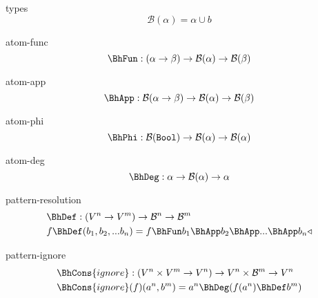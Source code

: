 \documentclass[preview]{standalone}
\begin{document}
\begin{docimage}{types}
  \begin{equation*}%
    \mathcal{B}(\alpha) = \alpha \cup b  
  \end{equation*}
\end{docimage} 


\begin{docimage}{atom-func}
  \begin{equation*}%
    \BhFun : (\alpha \rightarrow \beta) \rightarrow \mathcal{B}(\alpha) \rightarrow \mathcal{B}(\beta)  
  \end{equation*}
\end{docimage} 

\begin{docimage}{atom-app}
  \begin{equation*}%
    \BhApp :  \mathcal{B}(\alpha \rightarrow \beta) \rightarrow \mathcal{B}(\alpha) \rightarrow \mathcal{B}(\beta)  
  \end{equation*}
\end{docimage}

\begin{docimage}{atom-phi}
  \begin{equation*}%
    \BhPhi :  \mathcal{B}(\mathtt{Bool}) \rightarrow \mathcal{B}(\alpha) \rightarrow \mathcal{B}(\alpha)  
  \end{equation*}
\end{docimage}

\begin{docimage}{atom-deg}
  \begin{equation*}%
    \BhDeg :  \alpha \rightarrow \mathcal{B}(\alpha) \rightarrow \alpha  
  \end{equation*}
\end{docimage}

\begin{docimage}{pattern-resolution}
  \begin{align*}%
    &\BhDef :
      (V^n \rightarrow V^m)
      \rightarrow \mathcal{B}^n \rightarrow \mathcal{B}^m \\
    &f \BhDef (b_1,b_2,...b_n) =
      f \BhFun b_1 \BhApp b_2 \BhApp ... \BhApp b_n \triangleleft
  \end{align*}
\end{docimage}

\begin{docimage}{pattern-ignore}
  \begin{align*}%
    &\BhCons{ignore} :
      (V^n \times V^m \rightarrow V^n)
      \rightarrow V^n \times \mathcal{B}^m \rightarrow V^n \\
    &\BhCons{ignore} (f) (a^n,b^m) =
      a^n \BhDeg (f(a^n) \BhDef b^m)
  \end{align*}
\end{docimage}
\end{document}
